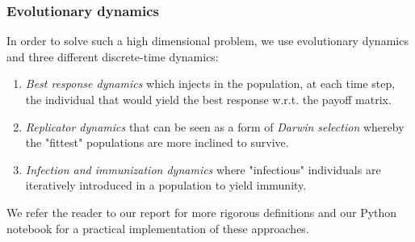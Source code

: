 \documentclass{beamer}
\begin{document}
\begin{frame}
    \frametitle{Evolutionary dynamics}
    In order to solve such a high dimensional problem, we use evolutionary dynamics and three different discrete-time dynamics:
    \begin{enumerate}
        \item \textit{Best response dynamics} which injects in the population, at each time step, the individual that would yield the best response w.r.t. the payoff matrix.
        \item \textit{Replicator dynamics} that can be seen as a form of \textit{Darwin selection} whereby the "fittest" populations are more inclined to survive.
        \item \textit{Infection and immunization dynamics} where "infectious" individuals are iteratively introduced in a population to yield immunity.
    \end{enumerate}
    We refer the reader to our report for more rigorous definitions and our Python notebook for a practical implementation of these approaches.
\end{frame}
\end{document}
